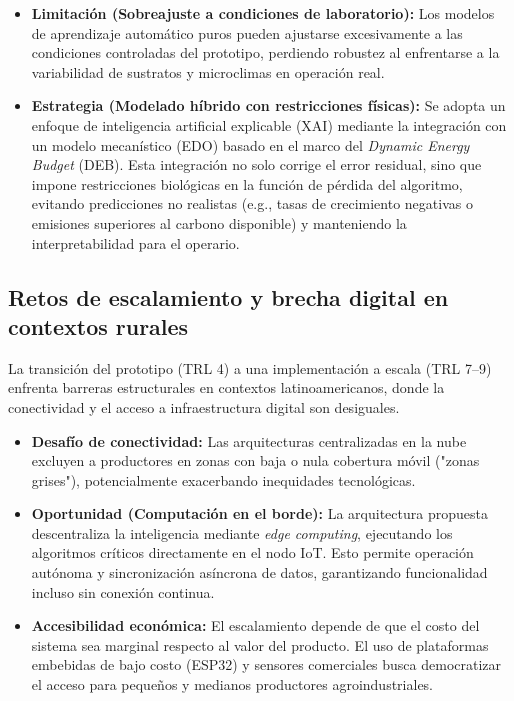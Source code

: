 

\begin{itemize}
    \item \textbf{Limitación (Sobreajuste a condiciones de laboratorio):} Los modelos de aprendizaje automático puros pueden ajustarse excesivamente a las condiciones controladas del prototipo, perdiendo robustez al enfrentarse a la variabilidad de sustratos y microclimas en operación real.
    \item \textbf{Estrategia (Modelado híbrido con restricciones físicas):} Se adopta un enfoque de inteligencia artificial explicable (XAI) mediante la integración con un modelo mecanístico (EDO) basado en el marco del \textit{Dynamic Energy Budget} (DEB). Esta integración no solo corrige el error residual, sino que impone restricciones biológicas en la función de pérdida del algoritmo, evitando predicciones no realistas (e.g., tasas de crecimiento negativas o emisiones superiores al carbono disponible) y manteniendo la interpretabilidad para el operario.
\end{itemize}

\subsection{Retos de escalamiento y brecha digital en contextos rurales}
La transición del prototipo (TRL 4) a una implementación a escala (TRL 7–9) enfrenta barreras estructurales en contextos latinoamericanos, donde la conectividad y el acceso a infraestructura digital son desiguales.





\begin{itemize}
    \item \textbf{Desafío de conectividad:} Las arquitecturas centralizadas en la nube excluyen a productores en zonas con baja o nula cobertura móvil ("zonas grises"), potencialmente exacerbando inequidades tecnológicas.
    \item \textbf{Oportunidad (Computación en el borde):} La arquitectura propuesta descentraliza la inteligencia mediante \textit{edge computing}, ejecutando los algoritmos críticos directamente en el nodo IoT. Esto permite operación autónoma y sincronización asíncrona de datos, garantizando funcionalidad incluso sin conexión continua.
    \item \textbf{Accesibilidad económica:} El escalamiento depende de que el costo del sistema sea marginal respecto al valor del producto. El uso de plataformas embebidas de bajo costo (ESP32) y sensores comerciales busca democratizar el acceso para pequeños y medianos productores agroindustriales.
\end{itemize}

